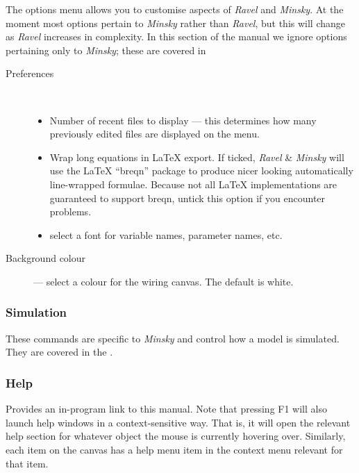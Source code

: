The options menu allows you to customise aspects of \emph{Ravel} and
\emph{Minsky}. At the moment most options pertain to \emph{Minsky}
rather than \emph{Ravel}, but this will change as \emph{Ravel} increases
in complexity. In this section of the manual we ignore options pertaining
only to \emph{Minsky}; these are covered in 
\begin{description}
\item [{Preferences}] %
\mbox{%
%
}
\begin{itemize}
\item Number of recent files to display --- this determines how many previously
edited files are displayed on the 
menu. 
\item \label{wrap-equations} Wrap long equations in \LaTeX{} export. If ticked,
\emph{Ravel} \& \emph{Minsky} will use the \LaTeX{} ``breqn'' package
to produce nicer looking automatically line-wrapped formulae. Because
not all \LaTeX{} implementations are guaranteed to support breqn, untick
this option if you encounter problems. 
\item \label{font} select a font for variable names, parameter names, etc. 
\end{itemize}
\item [{Background colour}] --- select a colour for the wiring canvas.
The default is white.
\end{description}

\subsubsection{Simulation}

These commands are specific to \emph{Minsky} and control how a model
is simulated. They are covered in the . 

\subsubsection{Help}

\label{Help}

Provides an in-program link to this manual. Note that pressing F1
will also launch help windows in a context-sensitive way. That is,
it will open the relevant help section for whatever object the mouse
is currently hovering over. Similarly, each item on the canvas has
a help menu item in the context menu relevant for that item.

